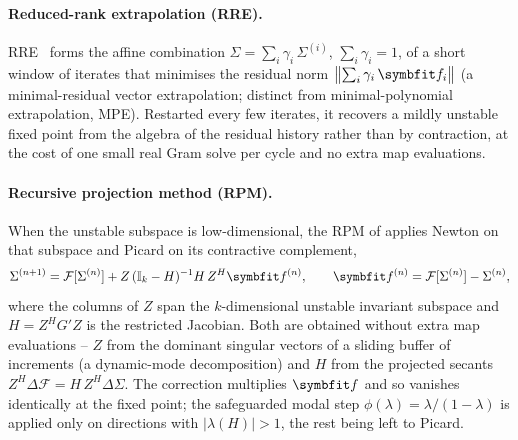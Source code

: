 \paragraph{Reduced-rank extrapolation (RRE).}
RRE~\cite{sidi_vector_2017} forms the affine combination
$\Sigma=\sum_i\gamma_i\,\Sigma^{(i)}$, $\sum_i\gamma_i=1$, of a short window of
iterates that minimises the residual norm
$\bigl\|\sum_i\gamma_i\,\vc{f}_i\bigr\|$ (a minimal-residual vector extrapolation;
distinct from minimal-polynomial extrapolation, MPE).
Restarted every few iterates, it recovers a mildly unstable fixed point from the
algebra of the residual history rather than by contraction, at the cost of one
small real Gram solve per cycle and no extra map evaluations.

\paragraph{Recursive projection method (RPM).}
When the unstable subspace is low-dimensional, the RPM of
\citet{shroff_stabilization_1993} applies Newton on that subspace and Picard on
its contractive complement,
\begin{equation}\label{eq:rpm}
  \Sigma^{(n+1)}
  =\mathcal{F}[\Sigma^{(n)}]
   +Z\,(\mathbb{I}_k-H)^{-1} H\,Z^{H}\vc{f}^{(n)},
  \qquad \vc{f}^{(n)}=\mathcal{F}[\Sigma^{(n)}]-\Sigma^{(n)},
\end{equation}
where the columns of $Z$ span the $k$-dimensional unstable invariant subspace and
$H=Z^{H}G'Z$ is the restricted Jacobian. Both are obtained without extra map
evaluations -- $Z$ from the dominant singular vectors of a sliding buffer of
increments (a dynamic-mode decomposition) and $H$ from the projected secants
$Z^{H}\Delta\mathcal{F}=H\,Z^{H}\Delta\Sigma$. The correction multiplies
$\vc{f}$ and so vanishes identically at the fixed point; the safeguarded modal
step $\phi(\lambda)=\lambda/(1-\lambda)$ is applied only on directions with
$|\lambda(H)|>1$, the rest being left to Picard.

